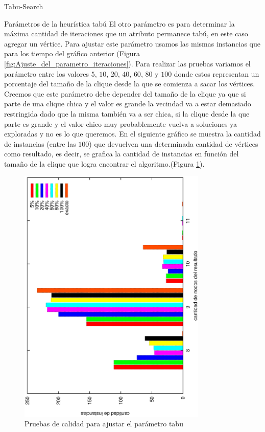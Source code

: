 \begin{section}{Tabu-Search}
\begin{subsection}{Parámetros de la heurística tabú}
		El otro parámetro es para determinar la máxima cantidad de iteraciones que un atributo permanece tabú, en este caso agregar un vértice. Para ajustar este parámetro usamos las mismas instancias que para los tiempo del gráfico anterior (Figura \ref{fig:Ajuste_del_parametro_iteraciones}). Para realizar las pruebas variamos el parámetro entre los valores $5$, $10$, $20$, $40$, $60$, $80$ y $100$ donde estos representan un porcentaje del tamaño de la clique desde la que se comienza a sacar los vértices. Creemos que este parámetro debe depender del tamaño de la clique ya que si parte de una clique chica y el valor es grande la vecindad va a estar demasiado restringida dado que la misma también va a ser chica, si la clique desde la que parte es grande y el valor chico muy probablemente vuelva a soluciones ya exploradas y no es lo que queremos. En el siguiente gráfico se muestra la cantidad de instancias (entre las $100$) que devuelven una determinada cantidad de vértices como resultado, es decir, se grafica la cantidad de instancias en función del tamaño de la clique que logra encontrar el algoritmo.(Figura \ref{fig:Ajuste_del_parametro_tabu}).

	\begin{figure}[H]
		\centering
		    	\includegraphics[width=9cm,angle=-90]{tabu_search/max_tabu2.eps}
		\caption{Pruebas de calidad para ajustar el parámetro tabu}
		\label{fig:Ajuste_del_parametro_tabu}
	\end{figure}


\end{subsection}
\end{section}
